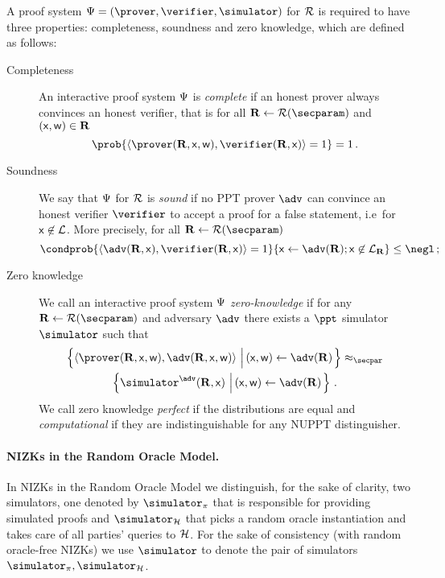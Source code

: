 \documentclass[runningheads,11pt]{llncs}
\theoremstyle{definition}
\begin{document}
A proof system $\proofsystem = (\prover, \verifier, \simulator)$ for $\mathcal{R}$ is required to have three properties: completeness, soundness and zero knowledge, which are defined as follows:
\begin{description}
	\item[Completeness] An interactive proof system $\mathrm{\Psi}$ is \emph{complete} if an honest prover always convinces an honest verifier, that is for all $\REL \gets \RELGEN(\secparam)$ and $(\mathsf{x}, \mathsf{w}) \in \mathbf{R}$
	\[
		\prob{\ip{\prover (\REL, \inp, \wit)}{\verifier (\REL, \inp)} = 1} = 1\,.
	\]
	\item[Soundness] We say that $\mathrm{\Psi}$ for $\mathcal{R}$ is \emph{sound} if no PPT prover $\adv$ can convince an honest verifier $\verifier$ to accept a proof for a false statement, i.e~for $\mathsf{x} \not\in\mathcal{L}$. More precisely, for all $\REL \gets \RELGEN(\secparam)$
	\[
		\condprob{\ip{\adv(\REL, \inp)}{\verifier(\REL, \inp)} = 1}{\inp \gets \adv(\REL); \inp \not\in \LANG_\REL} \leq \negl\,;
	\]
	\item[Zero knowledge] We call an interactive proof system $\mathrm{\Psi}$ \emph{zero-knowledge} if for any $\REL \gets \RELGEN(\secparam)$ and adversary $\adv$ there exists a $\ppt$ simulator $\simulator$ such that
	\begin{multline*}
	  \left\{\ip{\prover(\REL, \inp, \wit)}{\adv(\REL, \inp, \wit)} \,\left|\, (\inp, \wit) \gets \adv(\REL)\vphantom{\simulator^\adv}\right.\right\} \approx_\secpar
		\\
		\left\{\simulator^{\adv}(\REL, \inp)\,\left|\, (\inp, \wit) \gets \adv(\REL)\vphantom{\simulator^\adv}\right.\right\}\,.
	\end{multline*}
	We call zero knowledge \emph{perfect} if the distributions are equal and \emph{computational} if they are indistinguishable for any NUPPT distinguisher.
\end{description}

\paragraph{NIZKs in the Random Oracle Model.}
In NIZKs in the Random Oracle Model we distinguish, for the sake of clarity, two simulators, one denoted by $\simulator_\zkproof$ that is responsible for providing simulated proofs and $\simulator_\ro$ that picks a random oracle instantiation and takes care of all parties' queries to $\mathcal{H}$.
For the sake of consistency (with random oracle-free NIZKs) we use $\simulator$
to denote the pair of simulators $\simulator_\zkproof,
\simulator_\ro$.
\end{document}
